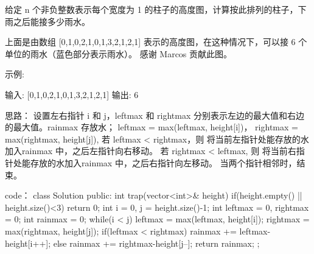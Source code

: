 给定 n 个非负整数表示每个宽度为 1 的柱子的高度图，计算按此排列的柱子，下雨之后能接多少雨水。



上面是由数组 [0,1,0,2,1,0,1,3,2,1,2,1] 表示的高度图，在这种情况下，可以接 6 个单位的雨水（蓝色部分表示雨水）。 感谢 Marcos 贡献此图。

示例:

输入: [0,1,0,2,1,0,1,3,2,1,2,1]
输出: 6

























思路：
设置左右指针 i 和 j，leftmax 和 rightmax 分别表示左边的最大值和右边的最大值。rainmax 存放水；
leftmax = max(leftmax, height[i])，
rightmax = max(rightmax, height[j]),
若 leftmax < rightmax，则 将当前左指针处能存放的水加入rainmax 中，之后左指针向右移动。
若 rightmax < leftmax, 则 将当前右指针处能存放的水加入rainmax 中，之后右指针向左移动。
当两个指针相邻时，结束。
























code：
class Solution {
public:
    int trap(vector<int>& height) {
        if(height.empty() || height.size()<3) return 0;
        int i = 0, j = height.size()-1;
        int leftmax = 0, rightmax = 0;
        int rainmax = 0;
        while(i < j)
        {
            leftmax = max(leftmax, height[i]);
            rightmax = max(rightmax, height[j]);
            if(leftmax < rightmax)
            {
                rainmax += leftmax-height[i++];
            }
            else
            {
                rainmax += rightmax-height[j--];
            }
        }
        return rainmax;
    }
};